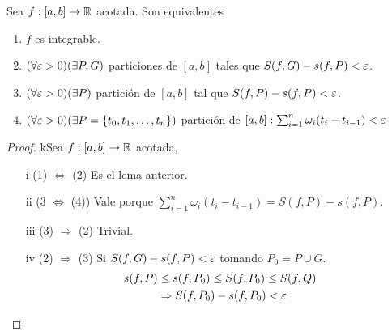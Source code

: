\begin{theorem}
  Sea \(f: [a, b] \to \mathbb{R} \) acotada. Son equivalentes \begin{enumerate}
    \item \(f\) es integrable.
    \item \((\forall \varepsilon > 0)(\exists P, G)\) particiones de \([a, b]\) tales que \(S(f, G) - s(f, P) < \varepsilon \).
    \item \((\forall \varepsilon > 0)(\exists P)\) partición de \([a, b]\) tal que \(S(f, P) - s(f, P) < \varepsilon \).
    \item \((\forall \varepsilon > 0)(\exists P = \{ t_0, t_1, \ldots, t_n \})\) partición de \([a, b] : \sum_{i = 1}^n \omega_i (t_i - t_{i-1}) < \varepsilon \)
  \end{enumerate}

  \begin{proof}
    kSea \(f: [a,b] \to \mathbb{R} \) acotada,
    \begin{enumerate}
      \item[i] (1) \(\iff \) (2) Es el lema anterior.
      \item[ii] (3 \(\iff \) (4)) Vale porque \(\sum_{i = 1}^n \omega_i (t_i - t_{i-1}) = S(f, P) - s(f, P)\).
      \item[iii] (3) \(\Rightarrow \) (2) Trivial.
      \item[iv] (2) \(\Rightarrow \) (3) Si \(S(f, G) - s(f, P) < \varepsilon \) tomando \(P_0 = P \cup G\). \begin{align*}
              s(f, P) & \leq s(f, P_0) \leq S(f, P_0) \leq S(f, Q) \\
                      & \Rightarrow S(f, P_0) - s(f, P_0) < \varepsilon
            \end{align*}
    \end{enumerate}
  \end{proof}
\end{theorem}

\clearpage

